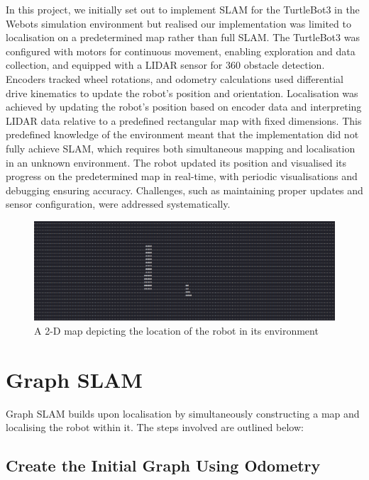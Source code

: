 In this project, we initially set out to implement SLAM for the TurtleBot3 in the Webots simulation environment but realised our implementation was limited to localisation on a predetermined map rather than full SLAM. The TurtleBot3 was configured with motors for continuous movement, enabling exploration and data collection, and equipped with a LIDAR sensor for 360\degree{} obstacle detection. Encoders tracked wheel rotations, and odometry calculations used differential drive kinematics to update the robot's position and orientation. Localisation was achieved by updating the robot’s position based on encoder data and interpreting LIDAR data relative to a predefined rectangular map with fixed dimensions. This predefined knowledge of the environment meant that the implementation did not fully achieve SLAM, which requires both simultaneous mapping and localisation in an unknown environment. The robot updated its position and visualised its progress on the predetermined map in real-time, with periodic visualisations and debugging ensuring accuracy. Challenges, such as maintaining proper updates and sensor configuration, were addressed systematically.




\begin{figure}[H]
    \centering
    \includegraphics[width=1.0\linewidth]{midpoint_report/assets/images/localisation/map.png}
    \caption{A 2-D map depicting the location of the robot in its environment}
    \label{fig: map}
\end{figure}

\section{Graph SLAM}

Graph SLAM builds upon localisation by simultaneously constructing a map and localising the robot within it. The steps involved are outlined below:

\subsection{Create the Initial Graph Using Odometry}

